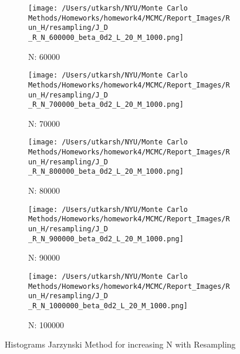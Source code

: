 \documentclass[11pt]{article}
\begin{document}
\begin{figure}[H]
	\begin{subfigure}{.18\textwidth}
		\texttt{[image: /Users/utkarsh/NYU/Monte Carlo Methods/Homeworks/homework4/MCMC/Report\_Images/Run\_H/resampling/J\_D \_R\_N\_600000\_beta\_0d2\_L\_20\_M\_1000.png]}
		\caption{N: 60000}
	\end{subfigure}
	\begin{subfigure}{.18\textwidth}
		\texttt{[image: /Users/utkarsh/NYU/Monte Carlo Methods/Homeworks/homework4/MCMC/Report\_Images/Run\_H/resampling/J\_D \_R\_N\_700000\_beta\_0d2\_L\_20\_M\_1000.png]}
		\caption{N: 70000}
	\end{subfigure}
	\begin{subfigure}{.18\textwidth}
		\texttt{[image: /Users/utkarsh/NYU/Monte Carlo Methods/Homeworks/homework4/MCMC/Report\_Images/Run\_H/resampling/J\_D \_R\_N\_800000\_beta\_0d2\_L\_20\_M\_1000.png]}
		\caption{N: 80000}
	\end{subfigure}	
	\begin{subfigure}{.18\textwidth}
		\texttt{[image: /Users/utkarsh/NYU/Monte Carlo Methods/Homeworks/homework4/MCMC/Report\_Images/Run\_H/resampling/J\_D \_R\_N\_900000\_beta\_0d2\_L\_20\_M\_1000.png]}
		\caption{N: 90000}
	\end{subfigure}	
	\begin{subfigure}{.18\textwidth}
		\texttt{[image: /Users/utkarsh/NYU/Monte Carlo Methods/Homeworks/homework4/MCMC/Report\_Images/Run\_H/resampling/J\_D \_R\_N\_1000000\_beta\_0d2\_L\_20\_M\_1000.png]}
		\caption{N: 100000}
	\end{subfigure}	
	\caption{Histograms Jarzynski Method for increasing N with Resampling}
	\label{fig:jarzynski_hist_resampling}
\end{figure}
\end{document}
